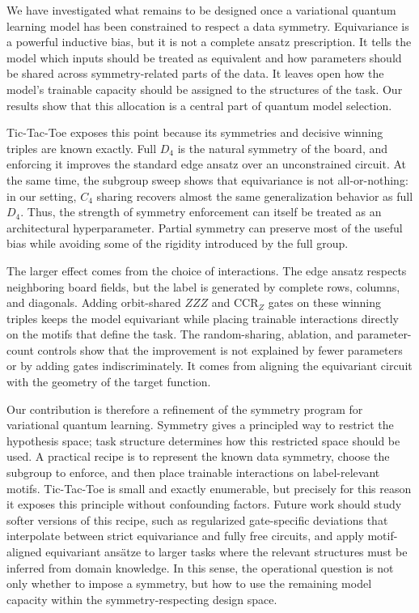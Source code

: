 We have investigated what remains to be designed once a variational quantum learning model has been constrained to respect a data symmetry. Equivariance is a powerful inductive bias, but it is not a complete ansatz prescription. It tells the model which inputs should be treated as equivalent and how parameters should be shared across symmetry-related parts of the data. It leaves open how the model's trainable capacity should be assigned to the structures of the task. Our results show that this allocation is a central part of quantum model selection.

Tic-Tac-Toe exposes this point because its symmetries and decisive winning triples are known exactly. Full $D_4$ is the natural symmetry of the board, and enforcing it improves the standard edge ansatz over an unconstrained circuit. At the same time, the subgroup sweep shows that equivariance is not all-or-nothing: in our setting, $C_4$ sharing recovers almost the same generalization behavior as full $D_4$. Thus, the strength of symmetry enforcement can itself be treated as an architectural hyperparameter. Partial symmetry can preserve most of the useful bias while avoiding some of the rigidity introduced by the full group.

The larger effect comes from the choice of interactions. The edge ansatz respects neighboring board fields, but the label is generated by complete rows, columns, and diagonals. Adding orbit-shared $ZZZ$ and $\mathrm{CCR}_Z$ gates on these winning triples keeps the model equivariant while placing trainable interactions directly on the motifs that define the task. The random-sharing, ablation, and parameter-count controls show that the improvement is not explained by fewer parameters or by adding gates indiscriminately. It comes from aligning the equivariant circuit with the geometry of the target function.

Our contribution is therefore a refinement of the symmetry program for variational quantum learning. Symmetry gives a principled way to restrict the hypothesis space; task structure determines how this restricted space should be used. A practical recipe is to represent the known data symmetry, choose the subgroup to enforce, and then place trainable interactions on label-relevant motifs. Tic-Tac-Toe is small and exactly enumerable, but precisely for this reason it exposes this principle without confounding factors. Future work should study softer versions of this recipe, such as regularized gate-specific deviations that interpolate between strict equivariance and fully free circuits, and apply motif-aligned equivariant ans\"atze to larger tasks where the relevant structures must be inferred from domain knowledge. In this sense, the operational question is not only whether to impose a symmetry, but how to use the remaining model capacity within the symmetry-respecting design space.
